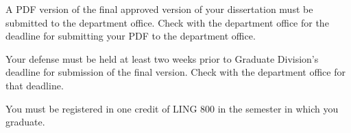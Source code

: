 \documentclass[
]{book}
\begin{document}
A PDF version of the final approved version of your dissertation must be submitted to the department office. Check with the department office for the deadline for submitting your PDF to the department office.

Your defense must be held at least two weeks prior to Graduate Division's deadline for submission of the final version. Check with the department office for that deadline.

You must be registered in one credit of LING 800 in the semester in which you graduate.

  
\end{document}
